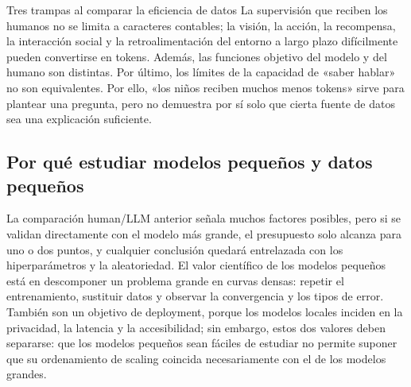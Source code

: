 



\begin{warningbox}{Tres trampas al comparar la eficiencia de datos}
La supervisión que reciben los humanos no se limita a caracteres contables; la visión, la acción, la recompensa, la interacción social y la retroalimentación del entorno a largo plazo difícilmente pueden convertirse en tokens. Además, las funciones objetivo del modelo y del humano son distintas. Por último, los límites de la capacidad de «saber hablar» no son equivalentes. Por ello, «los niños reciben muchos menos tokens» sirve para plantear una pregunta, pero no demuestra por sí solo que cierta fuente de datos sea una explicación suficiente.
\end{warningbox}





\subsection{Por qué estudiar modelos pequeños y datos pequeños}

La comparación human/LLM anterior señala muchos factores posibles, pero si se validan directamente con el modelo más grande, el presupuesto solo alcanza para uno o dos puntos, y cualquier conclusión quedará entrelazada con los hiperparámetros y la aleatoriedad. El valor científico de los modelos pequeños está en descomponer un problema grande en curvas densas: repetir el entrenamiento, sustituir datos y observar la convergencia y los tipos de error. También son un objetivo de deployment, porque los modelos locales inciden en la privacidad, la latencia y la accesibilidad; sin embargo, estos dos valores deben separarse: que los modelos pequeños sean fáciles de estudiar no permite suponer que su ordenamiento de scaling coincida necesariamente con el de los modelos grandes.

